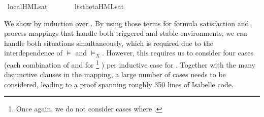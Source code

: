 \begin{isabellebody}
\ local{\isachardot}{\kern0pt}HML{\isacharunderscore}{\kern0pt}sat\ {\isacharparenleft}{\kern0pt}{\isachardoublequoteopen}{\isacharunderscore}{\kern0pt}\ {\isasymTurnstile}\ {\isacharunderscore}{\kern0pt}{\isachardoublequoteclose}\ {\isacharbrackleft}{\kern0pt}{}{}{\isacharcomma}{\kern0pt}\ {}{}{\isacharbrackright}{\kern0pt}\ {}{}{\isacharparenright}{\kern0pt}\isanewline
{}\isamarkupfalse%
\ lts{\isacharunderscore}{\kern0pt}theta{\isachardot}{\kern0pt}HML{\isacharunderscore}{\kern0pt}sat\ {\isacharparenleft}{\kern0pt}{\isachardoublequoteopen}{\isacharunderscore}{\kern0pt}\ {\isasymTurnstile}\ {\isacharunderscore}{\kern0pt}{\isachardoublequoteclose}\ {\isacharbrackleft}{\kern0pt}{}{}{\isacharcomma}{\kern0pt}\ {}{}{\isacharbrackright}{\kern0pt}\ {}{}{\isacharparenright}{\kern0pt}%
\begin{isamarkuptext}%
We show  by induction over \isa{{\isasymphi}}. By using those terms for formula satisfaction and process mappings that handle both triggered and stable environments, we can handle both situations simultaneously, which is required due to the interdependence of $\vDash$ and $\vDash_X$. However, this requires us to consider four cases (each combination of  and  for %
\footnote{Once again, we do not consider cases where .}%
) per inductive case for \isa{{\isasymphi}}. Together with the many disjunctive clauses in the mapping, a large number of cases needs to be considered, leading to a proof spanning roughly 350 lines of Isabelle code.%

\end{isamarkuptext}
\end{isabellebody}
